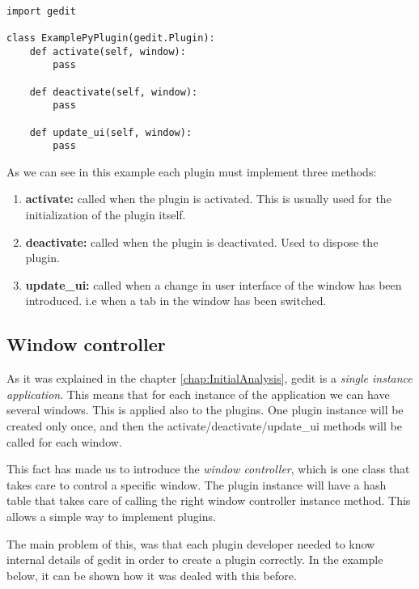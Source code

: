\begin{lstlisting}[style=python]

import gedit

class ExamplePyPlugin(gedit.Plugin):
    def activate(self, window):
        pass

    def deactivate(self, window):
        pass

    def update_ui(self, window):
        pass

\end{lstlisting}

As we can see in this example each plugin must implement three methods:
\begin{enumerate}
  \item \textbf{activate:} called when the plugin is activated. This is usually used for the initialization of the plugin itself.
  \item \textbf{deactivate:} called when the plugin is deactivated. Used to dispose the plugin.
  \item \textbf{update\_ui:} called when a change in user interface of the window has been introduced. i.e when a tab in the window has been switched.
\end{enumerate}

\subsection{Window controller}\label{sec:WindowController}

As it was explained in the chapter \ref{chap:InitialAnalysis}, gedit is a \emph{single instance application}. This means that for each instance of the application we can have several windows. This is applied also to the plugins. One plugin instance will be created only once, and then the activate/deactivate/update\_ui methods will be called for each window.

This fact has made us to introduce the \emph{window controller}, which is one class that takes care to control a specific window. The plugin instance will have a hash table that takes care of calling the right window controller instance method. This allows a simple way to implement plugins.

The main problem of this, was that each plugin developer needed to know internal details of gedit in order to create a plugin correctly. In the example below, it can be shown how it was dealed with this before.

